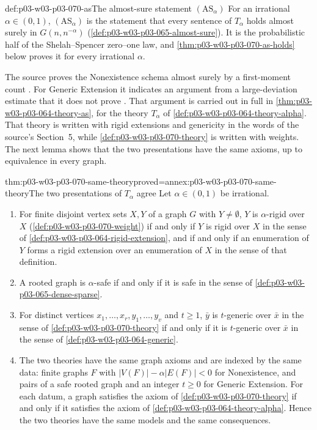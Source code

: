 \begin{hbconvention}{def:p03-w03-p03-070-as}{The almost-sure statement \((\mathrm{AS}_\alpha)\)}
For an irrational \(\alpha\in(0,1)\), \((\mathrm{AS}_\alpha)\) is the
statement that every sentence of \(T_\alpha\) holds almost surely in
\(G(n,n^{-\alpha})\) (\cref{def:p03-w03-p03-065-almost-sure}).  It is the
probabilistic half of the Shelah--Spencer zero--one law, and
\cref{thm:p03-w03-p03-070-as-holds} below proves it for every irrational
\(\alpha\).
\end{hbconvention}

The source proves the Nonexistence schema almost surely by a first-moment
count \cite[p.~8]{Spencer2007LogicRandomStructuresAuthor}.  For Generic
Extension it indicates an argument from a large-deviation estimate that it
does not prove \cite[pp.~10--11]{Spencer2007LogicRandomStructuresAuthor}.
That argument is carried out in full in
\cref{thm:p03-w03-p03-064-theory-as}, for the theory \(T_\alpha\) of
\cref{def:p03-w03-p03-064-theory-alpha}.  That theory is written with rigid
extensions and genericity in the words of the source's Section~5, while
\cref{def:p03-w03-p03-070-theory} is written with weights.  The next lemma
shows that the two presentations have the same axioms, up to equivalence in
every graph.

\begin{hblemma}{thm:p03-w03-p03-070-same-theory}{proved=annex:p03-w03-p03-070-same-theory}{The two presentations of \(T_\alpha\) agree}
Let \(\alpha\in(0,1)\) be irrational.
\begin{enumerate}
\item For finite disjoint vertex sets \(X,Y\) of a graph \(G\) with
      \(Y\neq\emptyset\), \(Y\) is \(\alpha\)-rigid over \(X\)
      (\cref{def:p03-w03-p03-070-weight}) if and only if \(Y\) is rigid over
      \(X\) in the sense of \cref{def:p03-w03-p03-064-rigid-extension}, and
      if and only if an enumeration of \(Y\) forms a rigid extension over an
      enumeration of \(X\) in the sense of that definition.
\item A rooted graph is \(\alpha\)-safe if and only if it is safe in the
      sense of \cref{def:p03-w03-p03-065-dense-sparse}.
\item For distinct vertices \(x_1,\ldots,x_r,y_1,\ldots,y_v\) and
      \(t\geq1\), \(\bar y\) is \(t\)-generic over \(\bar x\) in the sense of
      \cref{def:p03-w03-p03-070-theory} if and only if it is \(t\)-generic
      over \(\bar x\) in the sense of \cref{def:p03-w03-p03-064-generic}.
\item The two theories have the same graph axioms and are indexed by the
      same data: finite graphs \(F\) with \(|V(F)|-\alpha|E(F)|<0\) for
      Nonexistence, and pairs of a safe rooted graph and an integer
      \(t\geq0\) for Generic Extension.  For each datum, a graph satisfies the
      axiom of \cref{def:p03-w03-p03-070-theory} if and only if it satisfies
      the axiom of \cref{def:p03-w03-p03-064-theory-alpha}.  Hence the two
      theories have the same models and the same consequences.
\end{enumerate}
\end{hblemma}

